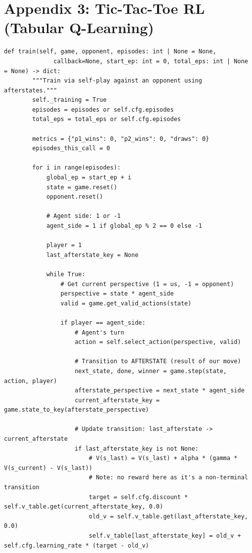 \section{Appendix 3: Tic-Tac-Toe RL (Tabular Q-Learning)}
{\small
\begin{lstlisting}[style=mypython]
    def train(self, game, opponent, episodes: int | None = None,
              callback=None, start_ep: int = 0, total_eps: int | None = None) -> dict:
        """Train via self-play against an opponent using afterstates."""
        self._training = True
        episodes = episodes or self.cfg.episodes
        total_eps = total_eps or self.cfg.episodes
        
        metrics = {"p1_wins": 0, "p2_wins": 0, "draws": 0}
        episodes_this_call = 0
        
        for i in range(episodes):
            global_ep = start_ep + i
            state = game.reset()
            opponent.reset()
            
            # Agent side: 1 or -1
            agent_side = 1 if global_ep % 2 == 0 else -1
            
            player = 1
            last_afterstate_key = None
            
            while True:
                # Get current perspective (1 = us, -1 = opponent)
                perspective = state * agent_side
                valid = game.get_valid_actions(state)
                
                if player == agent_side:
                    # Agent's turn
                    action = self.select_action(perspective, valid)
                    
                    # Transition to AFTERSTATE (result of our move)
                    next_state, done, winner = game.step(state, action, player)
                    afterstate_perspective = next_state * agent_side
                    current_afterstate_key = game.state_to_key(afterstate_perspective)
                    
                    # Update transition: last_afterstate -> current_afterstate
                    if last_afterstate_key is not None:
                        # V(s_last) = V(s_last) + alpha * (gamma * V(s_current) - V(s_last))
                        # Note: no reward here as it's a non-terminal transition
                        target = self.cfg.discount * self.v_table.get(current_afterstate_key, 0.0)
                        old_v = self.v_table.get(last_afterstate_key, 0.0)
                        self.v_table[last_afterstate_key] = old_v + self.cfg.learning_rate * (target - old_v)


\end{lstlisting}}
